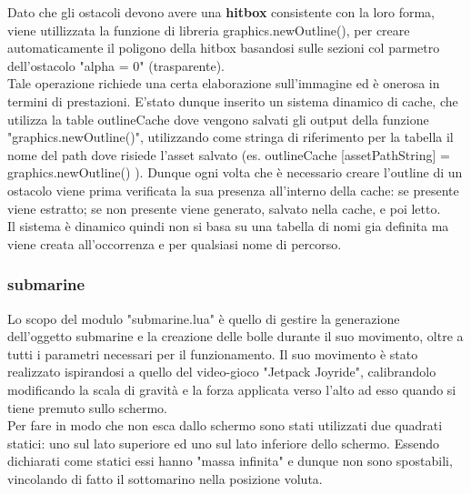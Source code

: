 \documentclass[15pt]{article}
\begin{document}
Dato che gli ostacoli devono avere una \textbf{hitbox} consistente con la loro forma, viene utillizzata la funzione di libreria 
graphics.newOutline(), per creare automaticamente il poligono della hitbox basandosi sulle sezioni col parmetro dell'ostacolo "alpha = 0" (trasparente).
\\

Tale operazione richiede una certa elaborazione sull’immagine ed è onerosa in termini di prestazioni. E'stato dunque inserito un sistema 
dinamico di cache, che utilizza la table outlineCache dove vengono salvati gli output della funzione "graphics.newOutline()", utilizzando come stringa di riferimento per la tabella il nome del path dove risiede l’asset salvato (es. outlineCache [assetPathString] = graphics.newOutline() ).
Dunque ogni volta che è necessario creare l’outline di un ostacolo viene prima verificata la sua presenza all'interno della cache: se presente viene
estratto; se non presente viene generato, salvato nella cache, e poi letto.
\\

Il sistema è dinamico quindi non si basa 
su una tabella di nomi gia definita ma viene creata all’occorrenza e per qualsiasi nome di percorso.

\subsubsection{submarine}
Lo scopo del modulo "submarine.lua" è quello di gestire la generazione dell'oggetto submarine e la creazione delle bolle durante il suo movimento, oltre a tutti i parametri necessari per il funzionamento.
Il suo movimento è stato realizzato ispirandosi a quello del video-gioco "Jetpack Joyride", calibrandolo modificando la scala di gravità e la forza applicata verso l'alto ad esso quando si tiene premuto sullo schermo.\\

Per fare in modo che non esca dallo schermo sono stati utilizzati due quadrati statici: uno sul lato superiore ed uno sul lato inferiore dello schermo. Essendo dichiarati come statici essi hanno "massa infinita" e dunque non sono spostabili, vincolando di fatto il sottomarino nella posizione voluta.\\
\end{document}
